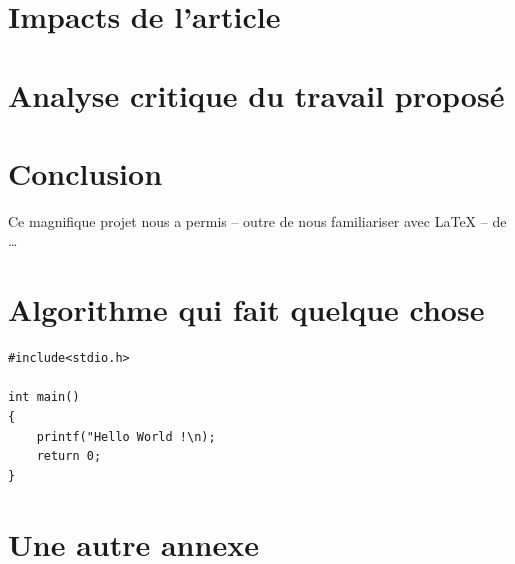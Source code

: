 \documentclass[a4paper, 12pt]{article}
\begin{document}
\clearpage 
\section{Impacts de l'article}

\clearpage 
\section{Analyse critique du travail proposé}

\clearpage 
\section*{Conclusion}

Ce magnifique projet nous a permis -- outre de nous familiariser avec \LaTeX{} -- de \ldots

\clearpage 




\clearpage 
\appendix
\bigskip{}
\section{Algorithme qui fait quelque chose}
\begin{verbatim}
#include<stdio.h>

int main()
{
	printf("Hello World !\n);
	return 0;
}
\end{verbatim}

\clearpage 
\section{Une autre annexe}
\end{document}
